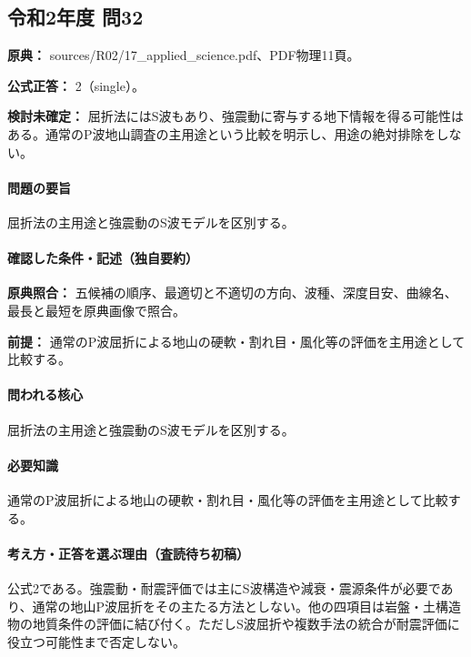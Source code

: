 \subsection{令和2年度 問32}
\label{q:r02-reg-applied-32}

\noindent\textbf{原典：} sources/R02/17\_applied\_science.pdf、PDF物理11頁。

\textbf{公式正答：} 2（single）。

\par\textbf{検討未確定：} 屈折法にはS波もあり、強震動に寄与する地下情報を得る可能性はある。通常のP波地山調査の主用途という比較を明示し、用途の絶対排除をしない。

\paragraph{問題の要旨} 屈折法の主用途と強震動のS波モデルを区別する。

\paragraph{確認した条件・記述（独自要約）}\mbox{}\par

\noindent\textbf{原典照合：} 五候補の順序、最適切と不適切の方向、波種、深度目安、曲線名、最長と最短を原典画像で照合。\par

\noindent\textbf{前提：} 通常のP波屈折による地山の硬軟・割れ目・風化等の評価を主用途として比較する。\par

\paragraph{問われる核心} 屈折法の主用途と強震動のS波モデルを区別する。

\paragraph{必要知識} 通常のP波屈折による地山の硬軟・割れ目・風化等の評価を主用途として比較する。

\paragraph{考え方・正答を選ぶ理由（査読待ち初稿）} 公式2である。強震動・耐震評価では主にS波構造や減衰・震源条件が必要であり、通常の地山P波屈折をその主たる方法としない。他の四項目は岩盤・土構造物の地質条件の評価に結び付く。ただしS波屈折や複数手法の統合が耐震評価に役立つ可能性まで否定しない。


